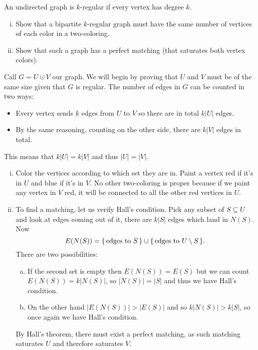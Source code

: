 \documentclass[12pt]{memoir}
\begin{document}
\begin{Ej}[Exercise 9]
   An undirected graph is $k$-regular if every vertex has degree $k$.
   \begin{enumerate}[i)]
    \itemsep=-0.4em
    \item Show that a bipartite $k$-regular graph must have the same number of vertices of each color in a two-coloring.
    \item Show that such a graph has a perfect matching (that saturates both vertex colors).
   \end{enumerate} 
\end{Ej}
\begin{ptcbr}
    Call $G=U\cupdot V$ our graph. We will begin by proving that $U$ and $V$ must be of the same size given that $G$ is regular. The number of edges in $G$ can be counted in two ways:
    \begin{itemize}
        \itemsep=-0.4em
        \item Every vertex sends $k$ edges from $U$ to $V$ so there are in total $k|U|$ edges.
        \item By the same reasoning, counting on the other side, there are $k|V|$ edges in total. 
    \end{itemize}
    This means that $k|U|=k|V|$ and thus $|U|=|V|$.
    \begin{enumerate}[i)]
        \itemsep=-0.4em
        \item Color the vertices according to which set they are in. Paint a vertex red if it's in $U$ and blue if it's in $V$. No other two-coloring is proper because if we paint any vertex in $V$ red, it will be connected to all the other red vertices in $U$. 
        \item To find a matching, let us verify Hall's condition. Pick any subset of $S\subseteq U$ and look at edges coming out of it, there are $k|S|$ edges which land in $N(S)$. Now 
        $$E(N(S))=\{\,\text{edges to }S\,\}\cup\{\,\text{edges to }U\setminus S\,\}.$$
        There are two possibilities:
        \begin{enumerate}[a)]
            \itemsep=-0.4em
            \item If the second set is empty then $E(N(S))=E(S)$ but we can count $E(N(S))=k|N(S)|$, so $|N(S)|=|S|$ and thus we have Hall's condition.
            \item On the other hand $|E(N(S))|> |E(S)|$ and so $k|N(S)|>k|S|$, so once again we have Hall's condition.
        \end{enumerate}
        By Hall's theorem, there must exist a perfect matching, as such matching saturates $U$ and therefore saturates $V$.
    \end{enumerate}
\end{ptcbr}
\end{document}
